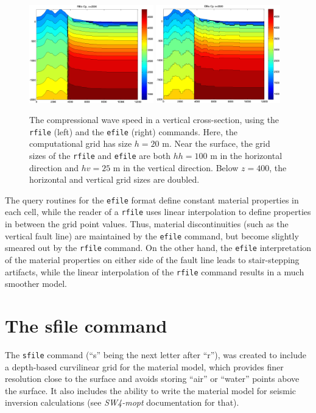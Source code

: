 \documentclass[11pt]{report}
\begin{document}
\begin{figure}
\begin{centering}
  \includegraphics[width=0.48\textwidth]{figures/rfile-cp-x.png}\hfill
\includegraphics[width=0.48\textwidth]{figures/efile-cp-x.png}\\
  \caption{The compressional wave speed in a vertical cross-section, using the {\tt rfile} (left) and the {\tt efile} (right) commands. Here,
    the computational grid has size $h=20$ m. Near the surface, the grid sizes of the {\tt rfile}
  and {\tt efile} are both $hh=100$ m in the horizontal direction and $hv=25$ m in the vertical
  direction. Below $z=400$, the horizontal and vertical grid sizes are doubled.}
  \label{fig:rfile-efile-2}
\end{centering}
\end{figure}
The query routines for the {\tt efile} format define constant material properties in each cell,
while the reader of a {\tt rfile} uses linear interpolation to define properties in between the grid
point values. Thus, material discontinuities (such as the vertical fault line) are maintained by 
the {\tt efile} command, but become slightly smeared out by the {\tt rfile} command. On the other
hand, the {\tt efile} interpretation of the material properties on either side of the fault line
leads to stair-stepping artifacts, while the linear interpolation of the {\tt rfile} command results
in a much smoother model.


\section{The sfile command} \label{sec:sfile-mat}
The \verb+sfile+ command (``s'' being the next letter after ``r''), was
  created to include a depth-based curvilinear grid for the material model,
  which provides finer resolution close to the surface and avoids storing
  ``air'' or ``water'' points above the surface.
It also includes the ability to write the material model for seismic
  inversion calculations (see {\em SW4-mopt} documentation for that).
\end{document}
